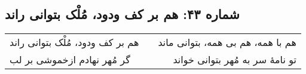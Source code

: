 \begin{center}
\section*{شماره ۴۳: هم بر کف ودود، مُلْک بتوانی راند}
\label{sec:043}
\begin{longtable}{l p{0.5cm} r}
هم بر کف ودود، مُلْک بتوانی راند
&&
هم با همه، هم بی همه، بتوانی ماند
\\
گر مُهر نهادم ازخموشی بر لب
&&
تو نامهٔ سر به مُهر بتوانی خواند
\\
\end{longtable}
\end{center}
